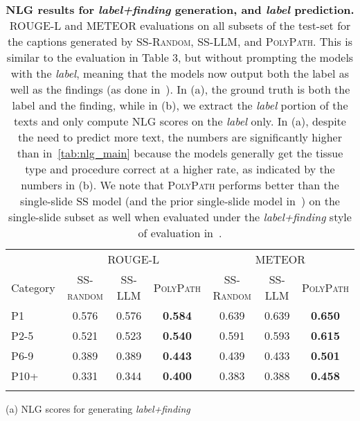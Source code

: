 \documentclass[11pt]{article}
\newcommand{\ourmodel}{\textsc{PolyPath}\xspace}
\newcommand{\randommodel}{\textsc{SS-Random}\xspace}
\newcommand{\llmmodel}{\textsc{SS-LLM}\xspace}
\begin{document}
\begin{table}[h]
\small
\centering
\caption{\small \textbf{NLG results for \emph{label+finding} generation, and \emph{label} prediction.} ROUGE-L and METEOR evaluations on all subsets of the test-set for the captions generated by \randommodel, \llmmodel, and \ourmodel. This is similar to the evaluation in Table 3, but without prompting the models with the \emph{label}, meaning that the models now output both the label as well as the findings (as done in~\citet{ahmed2024pathalign}). In (a), the ground truth is both the label and the finding, while in (b), we extract the \emph{label} portion of the texts and only compute NLG scores on the \emph{label} only. In (a), despite the need to predict more text, the numbers are significantly higher than in~\autoref{tab:nlg_main} because the models generally get the tissue type and procedure correct at a higher rate, as indicated by the numbers in (b). We note that \ourmodel performs better than the single-slide \textsc{SS} model (and the prior single-slide model in~\citet{ahmed2024pathalign}) on the single-slide subset as well when evaluated under the \emph{label+finding} style of evaluation in~\citet{ahmed2024pathalign}.}
\vspace{0.2cm}
\begin{tabular}{@{} l *{3}{c} *{3}{c} @{}}
\toprule
 & \multicolumn{3}{c}{ROUGE-L} & \multicolumn{3}{c}{METEOR} \\
\cmidrule(lr){2-4} \cmidrule(lr){5-7}
Category & \textsc{SS-random} & \textsc{SS-LLM} & \ourmodel & \randommodel & \llmmodel & \ourmodel \\
\midrule
P1    & 0.576 & 0.576 & \textbf{0.584} & 0.639 & 0.639 & \textbf{0.650} \\
P2-5  & 0.521 & 0.523 & \textbf{0.540} & 0.591 & 0.593 & \textbf{0.615} \\
P6-9  & 0.389 & 0.389 & \textbf{0.443} & 0.439 & 0.433 & \textbf{0.501} \\
P10+  & 0.331 & 0.344 & \textbf{0.400} & 0.383 & 0.388 & \textbf{0.458} \\
\Xhline{2.5\arrayrulewidth}
\end{tabular}
\vspace{0.1cm}

(a) NLG scores for generating \emph{label+finding}
\vspace{0.4cm}


\end{table}
\end{document}
